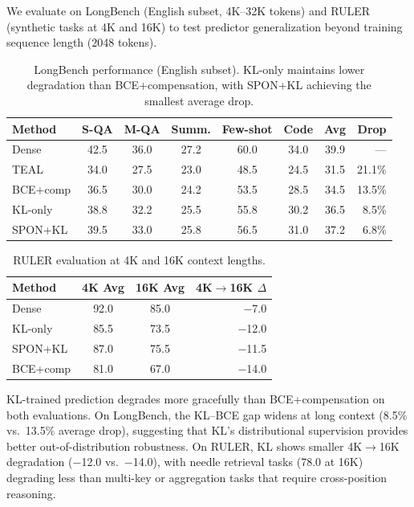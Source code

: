 \documentclass[11pt]{article}
\begin{document}
We evaluate on LongBench (English subset, 4K--32K tokens) and RULER (synthetic tasks at 4K and 16K) to test predictor generalization beyond training sequence length (2048 tokens).

\begin{table}[t]
\centering
\caption{LongBench performance (English subset). KL-only maintains lower degradation than BCE+compensation, with SPON+KL achieving the smallest average drop.}
\label{tab:longbench}
\small
\setlength{\tabcolsep}{4pt}
\begin{tabular}{lccccccr}
\toprule
Method & S-QA & M-QA & Summ. & Few-shot & Code & Avg & Drop \\
\midrule
Dense & 42.5 & 36.0 & 27.2 & 60.0 & 34.0 & 39.9 & --- \\
TEAL & 34.0 & 27.5 & 23.0 & 48.5 & 24.5 & 31.5 & 21.1\% \\
BCE+comp & 36.5 & 30.0 & 24.2 & 53.5 & 28.5 & 34.5 & 13.5\% \\
KL-only & 38.8 & 32.2 & 25.5 & 55.8 & 30.2 & 36.5 & 8.5\% \\
SPON+KL & 39.5 & 33.0 & 25.8 & 56.5 & 31.0 & 37.2 & 6.8\% \\
\bottomrule
\end{tabular}
\end{table}

\begin{table}[t]
\centering
\caption{RULER evaluation at 4K and 16K context lengths.}
\label{tab:ruler}
\small
\begin{tabular}{lccr}
\toprule
Method & 4K Avg & 16K Avg & 4K$\rightarrow$16K $\Delta$ \\
\midrule
Dense & 92.0 & 85.0 & $-$7.0 \\
KL-only & 85.5 & 73.5 & $-$12.0 \\
SPON+KL & 87.0 & 75.5 & $-$11.5 \\
BCE+comp & 81.0 & 67.0 & $-$14.0 \\
\bottomrule
\end{tabular}
\end{table}

KL-trained prediction degrades more gracefully than BCE+compensation on both evaluations. On LongBench, the KL--BCE gap widens at long context (8.5\% vs.\ 13.5\% average drop), suggesting that KL's distributional supervision provides better out-of-distribution robustness. On RULER, KL shows smaller 4K$\rightarrow$16K degradation ($-$12.0 vs.\ $-$14.0), with needle retrieval tasks (78.0 at 16K) degrading less than multi-key or aggregation tasks that require cross-position reasoning.
\end{document}
